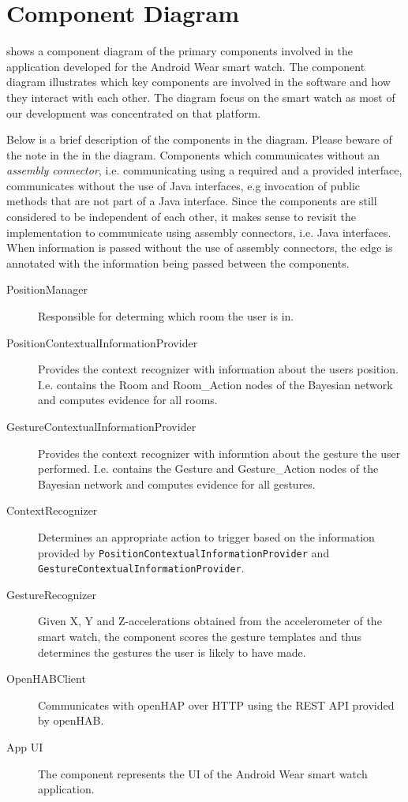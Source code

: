 \section{Component Diagram}
\label{sec:implementation:component-diagram}

 shows a component diagram of the primary components involved in the application developed for the Android Wear smart watch. The component diagram illustrates which key components are involved in the software and how they interact with each other.
The diagram focus on the smart watch as most of our development was concentrated on that platform. 

Below is a brief description of the components in the diagram. Please beware of the note in the in the diagram. Components which communicates without an \emph{assembly connector}, i.e. communicating using a required and a provided interface, communicates without the use of Java interfaces, e.g invocation of public methods that are not part of a Java interface. Since the components are still considered to be independent of each other, it makes sense to revisit the implementation to communicate using assembly connectors, i.e. Java interfaces. When information is passed without the use of assembly connectors, the edge is annotated with the information being passed between the components.

\begin{description}
\item[PositionManager] Responsible for determing which room the user is in.
\item[PositionContextualInformationProvider] Provides the context recognizer with information about the users position. I.e. contains the Room and Room\_Action nodes of the Bayesian network and computes evidence for all rooms.
\item[GestureContextualInformationProvider] Provides the context recognizer with informtion about the gesture the user performed. I.e. contains the Gesture and Gesture\_Action nodes of the Bayesian network and computes evidence for all gestures.
\item[ContextRecognizer] Determines an appropriate action to trigger based on the information provided by \texttt{PositionContextualInformationProvider} and \texttt{GestureContextualInformationProvider}.
\item[GestureRecognizer] Given X, Y and Z-accelerations obtained from the accelerometer of the smart watch, the component scores the gesture templates and thus determines the gestures the user is likely to have made.
\item[OpenHABClient] Communicates with openHAP over HTTP using the REST API provided by openHAB.
\item[App UI] The component represents the UI of the Android Wear smart watch application.
\end{description}

